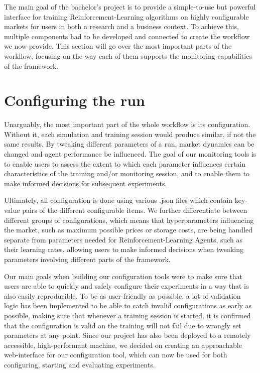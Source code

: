 \label{chapter:OurWorkflow}

\begin{jointwork}
	The main goal of the bachelor's project is to provide a simple-to-use but powerful interface for training Reinforcement-Learning algorithms on highly configurable markets for users in both a research and a business context. To achieve this, multiple components had to be developed and connected to create the workflow we now provide. This section will go over the most important parts of the workflow, focusing on the way each of them supports the monitoring capabilities of the framework.
\end{jointwork}

\section{Configuring the run}

Unarguably, the most important part of the whole workflow is its configuration. Without it, each simulation and training session would produce similar, if not the same results. By tweaking different parameters of a run, market dynamics can be changed and agent performance be influenced. The goal of our monitoring tools is to enable users to assess the extent to which each parameter influences certain characteristics of the training and/or monitoring session, and to enable them to make informed decisions for subsequent experiments. 

Ultimately, all configuration is done using various .json files which contain key-value pairs of the different configurable items. We further differentiate between different groups of configurations, which means that hyperparameters influencing the market, such as maximum possible prices or storage costs, are being handled separate from parameters needed for Reinforcement-Learning Agents, such as their learning rates, allowing users to make informed decisions when tweaking parameters involving different parts of the framework.

Our main goals when building our configuration tools were to make sure that users are able to quickly and safely configure their experiments in a way that is also easily reproducible. To be as user-friendly as possible, a lot of validation logic has been implemented to be able to catch invalid configurations as early as possible, making sure that whenever a training session is started, it is confirmed that the configuration is valid an the training will not fail due to wrongly set parameters at any point. Since our project has also been deployed to a remotely accessible, high-performant machine, we decided on creating an approachable web-interface for our configuration tool, which can now be used for both configuring, starting and evaluating experiments.


